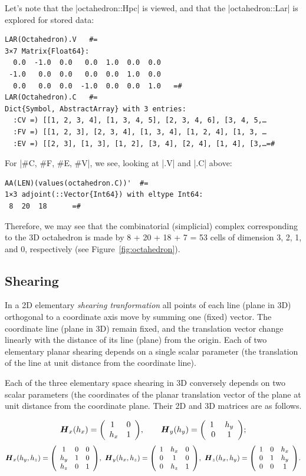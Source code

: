\begin{coding}
\begin{coding}
Let’s note that the |octahedron::Hpc| is viewed, and that the |octahedron::Lar| is explored for stored data:\\
\begin{lstlisting}[language=JuliaLocal, style=julia, mathescape=true]
LAR(Octahedron).V 	#=
3×7 Matrix{Float64}:
  0.0  -1.0  0.0   0.0  1.0  0.0  0.0
 -1.0   0.0  0.0   0.0  0.0  1.0  0.0
  0.0   0.0  0.0  -1.0  0.0  0.0  1.0 	=#
LAR(Octahedron).C	#=
Dict{Symbol, AbstractArray} with 3 entries:
  :CV =) [[1, 2, 3, 4], [1, 3, 4, 5], [2, 3, 4, 6], [3, 4, 5,…
  :FV =) [[1, 2, 3], [2, 3, 4], [1, 3, 4], [1, 2, 4], [1, 3, …
  :EV =) [[2, 3], [1, 3], [1, 2], [3, 4], [2, 4], [1, 4], [3,…=#
\end{lstlisting}

For |$\#$C, $\#$F, $\#$E, $\#$V|, we see, looking at |.V| and |.C| above:
\begin{lstlisting}[language=JuliaLocal, style=julia, mathescape=true]
AA(LEN)(values(octahedron.C))'	#=
1×3 adjoint(::Vector{Int64}) with eltype Int64:
 8  20  18		=#
\end{lstlisting}
Therefore, we may see that the combinatorial (simplicial) complex corresponding to the 3D octahedron is made by 
8 + 20 + 18 + 7 = 53 cells of dimension 3, 2, 1, and 0, respectively (see Figure~\ref{fig:octahedron}).
\end{coding}




\subsection*{Shearing}
\label{s*ec:ccccccc}

In  a 2D elementary \emph{shearing tranformation} all points of each line (plane in 3D) orthogonal to a coordinate axis move by summing one (fixed) vector. The coordinate line (plane in 3D) remain fixed, and the translation vector change linearly with the distance of its line (plane) from the origin. Each of two elementary planar shearing depends on a single scalar parameter (the translation of the line at unit distance from the coordinate line). 

Each of the three elementary space shearing in 3D conversely depends on two scalar parameters (the coordinates of the planar translation vector of the plane at unit distance from the coordinate plane. Their 2D  and 3D matrices are as follows.

\[
{\mbox{\boldmath $H$}}_x(h_x) = {\left(\begin{array}{cccccccc}1\  & 0\\h_x & 1 \end{array}\right)},\qquad
{\mbox{\boldmath $H$}}_y(h_y) = {\left(\begin{array}{cccccccc}1\  & h_y\\0 & 1 \end{array}\right)};
\]
\[
\T{H}_x(h_y,h_z) = \mat{1 & 0 &  0 \\h_y & 1 & 0\\h_z & 0 & 1},\ 
\T{H}_y(h_x,h_z) = \mat{1 & h_x & 0 \\0 & 1 & 0\\0 & h_z & 1},\ 
\T{H}_z(h_x,h_y) = \mat{1 &  0 &  h_x\\0 & 1 & h_y\\0 & 0 & 1}.
\]


\end{coding}
